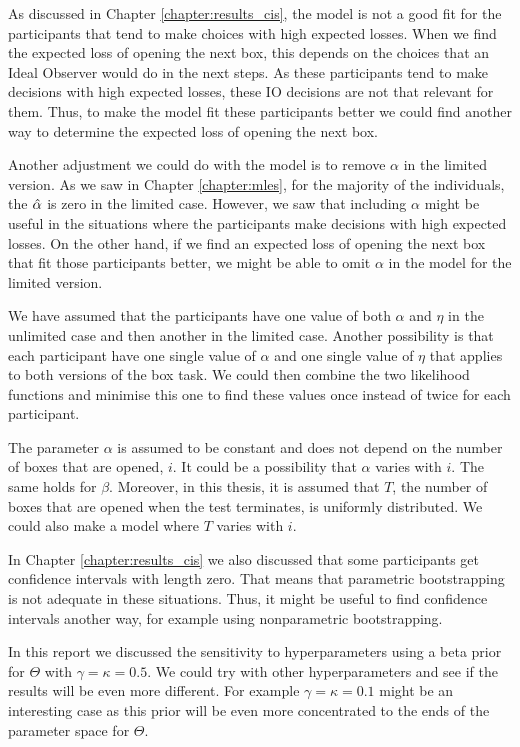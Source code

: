 As discussed in Chapter \ref{chapter:results_cis}, the model is not a good fit for the participants that tend to make choices with high expected losses. When we find the expected loss of opening the next box, this depends on the choices that an Ideal Observer would do in the next steps. As these participants tend to make decisions with high expected losses, these IO decisions are not that relevant for them. Thus, to make the model fit these participants better we could find another way to determine the expected loss of opening the next box. 

Another adjustment we could do with the model is to remove $\alpha$ in the limited version. As we saw in Chapter \ref{chapter:mles},
for the majority of the individuals, the $\hat{\alpha}$ is zero in the limited case. However, we saw that including $\alpha$ might be useful in the situations where the participants make decisions with high expected losses. On the other hand, if we find an expected loss of opening the next box that fit those participants better, we might be able to omit $\alpha$ in the model for the limited version.

We have assumed that the participants have one value of both $\alpha$ and $\eta$ in the unlimited case and then another in the limited case. Another possibility is that each participant have one single value of $\alpha$ and one single value of $\eta$ that applies to both versions of the box task. We could then combine the two likelihood functions and minimise this one to find these values once instead of twice for each participant. 

The parameter $\alpha$ is assumed to be constant and does not depend on the number of boxes that are opened, $i$. It could be a possibility that $\alpha$ varies with $i$. The same holds for $\beta$. Moreover, in this thesis, it is assumed that $T$, the number of boxes that are opened when the test terminates, is uniformly distributed. We could also make a model where $T$ varies with $i$. 

In Chapter \ref{chapter:results_cis} we also discussed that some participants get confidence intervals with length zero. That means that parametric bootstrapping is not adequate in these situations. Thus, it might be useful to find confidence intervals another way, for example using nonparametric bootstrapping. 

In this report we discussed the sensitivity to hyperparameters using a beta prior for $\Theta$ with $\gamma=\kappa=0.5$. We could try with other hyperparameters and see if the results will be even more different. For example $\gamma=\kappa=0.1$ might be an interesting case as this prior will be even more concentrated to the ends of the parameter space for $\Theta$. 


